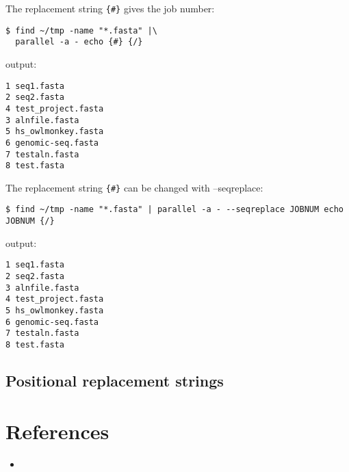 \documentclass{article}
\begin{document}
The replacement string \texttt{\{\#\}} gives the job number:
\begin{lstlisting}
$ find ~/tmp -name "*.fasta" |\
  parallel -a - echo {#} {/}
\end{lstlisting}
output:
\begin{lstlisting}
1 seq1.fasta
2 seq2.fasta
4 test_project.fasta
3 alnfile.fasta
5 hs_owlmonkey.fasta
6 genomic-seq.fasta
7 testaln.fasta
8 test.fasta
\end{lstlisting}

The replacement string \texttt{\{\#\}} can be changed with --seqreplace:
\begin{lstlisting}
$ find ~/tmp -name "*.fasta" | parallel -a - --seqreplace JOBNUM echo JOBNUM {/}
\end{lstlisting}
output:
\begin{lstlisting}
1 seq1.fasta
2 seq2.fasta
3 alnfile.fasta
4 test_project.fasta
5 hs_owlmonkey.fasta
6 genomic-seq.fasta
7 testaln.fasta
8 test.fasta
\end{lstlisting}

\subsection{Positional replacement strings}


\section{References}
\begin{itemize}
\item{}
\end{itemize}
\end{document}
